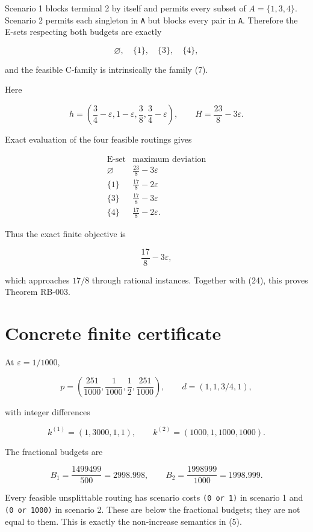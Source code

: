 \documentclass[
  11pt,
]{article}
\begin{document}
Scenario 1 blocks terminal 2 by itself and permits every subset of
\(A=\{1,3,4\}\). Scenario 2 permits each singleton in \texttt{A} but
blocks every pair in \texttt{A}. Therefore the E-sets respecting both
budgets are exactly

\[
\varnothing,
\quad\{1\},
\quad\{3\},
\quad\{4\},
\]

and the feasible C-family is intrinsically the family (7).

Here

\[
h=\left(
\frac34-\varepsilon,
1-\varepsilon,
\frac38,
\frac34-\varepsilon
\right),
\qquad
H=\frac{23}{8}-3\varepsilon.
\]

Exact evaluation of the four feasible routings gives

\[
\begin{array}{c|c}
\text{E-set}&\text{maximum deviation}\\
\hline
\varnothing&\frac{23}{8}-3\varepsilon\\
\{1\}&\frac{17}{8}-2\varepsilon\\
\{3\}&\frac{17}{8}-3\varepsilon\\
\{4\}&\frac{17}{8}-2\varepsilon.
\end{array}
\tag{27}
\]

Thus the exact finite objective is

\[
\frac{17}{8}-3\varepsilon,
\]

which approaches \(17/8\) through rational instances. Together with
(24), this proves Theorem RB-003.

\section{Concrete finite certificate}\label{concrete-finite-certificate}

At \(\varepsilon=1/1000\),

\[
p=\left(\frac{251}{1000},\frac1{1000},\frac12,
\frac{251}{1000}\right),
\qquad
d=(1,1,3/4,1),
\]

with integer differences

\[
k^{(1)}=(1,3000,1,1),
\qquad
k^{(2)}=(1000,1,1000,1000).
\]

The fractional budgets are

\[
B_1=\frac{1499499}{500}=2998.998,
\qquad
B_2=\frac{1998999}{1000}=1998.999.
\]

Every feasible unsplittable routing has scenario costs
\texttt{(0\ or\ 1)} in scenario 1 and \texttt{(0\ or\ 1000)} in scenario
2. These are below the fractional budgets; they are not equal to them.
This is exactly the non-increase semantics in (5).
\end{document}
